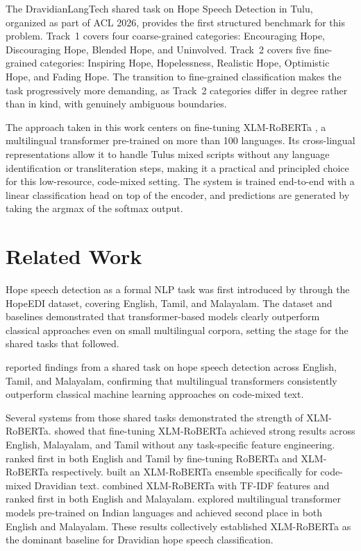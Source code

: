 \documentclass[11pt]{article}
\begin{document}
The DravidianLangTech shared task on Hope Speech Detection in Tulu,
organized as part of ACL 2026, provides the first structured benchmark for this
problem. Track~1 covers four coarse-grained categories: Encouraging Hope,
Discouraging Hope, Blended Hope, and Uninvolved. Track~2 covers five fine-grained
categories: Inspiring Hope, Hopelessness, Realistic Hope, Optimistic Hope, and
Fading Hope. The transition to fine-grained classification makes the task
progressively more demanding, as Track~2 categories differ in degree rather than
in kind, with genuinely ambiguous boundaries.

The approach taken in this work centers on fine-tuning XLM-RoBERTa \citep{conneau2020},
a multilingual transformer pre-trained on more than 100 languages. Its cross-lingual
representations allow it to handle Tulu\textquotesingle{}s mixed scripts without any
language identification or transliteration steps, making it a practical and principled
choice for this low-resource, code-mixed setting. The system is trained end-to-end
with a linear classification head on top of the encoder, and predictions are generated
by taking the argmax of the softmax output.

\section{Related Work}

Hope speech detection as a formal NLP task was first introduced by
 through the HopeEDI dataset, covering English, Tamil, and
Malayalam. The dataset and baselines demonstrated that transformer-based models
clearly outperform classical approaches even on small multilingual corpora, setting
the stage for the shared tasks that followed.

 reported findings from a shared task on hope speech
detection across English, Tamil, and Malayalam, confirming that multilingual
transformers consistently outperform classical machine learning approaches on
code-mixed text.

Several systems from those shared tasks demonstrated the strength of XLM-RoBERTa.
 showed that fine-tuning XLM-RoBERTa achieved strong results
across English, Malayalam, and Tamil without any task-specific feature engineering.
 ranked first in both English and Tamil by fine-tuning RoBERTa
and XLM-RoBERTa respectively.  built an XLM-RoBERTa
ensemble specifically for code-mixed Dravidian text.  combined
XLM-RoBERTa with TF-IDF features and ranked first in both English and Malayalam.
 explored multilingual transformer models pre-trained on Indian
languages and achieved second place in both English and Malayalam. These results
collectively established XLM-RoBERTa as the dominant baseline for Dravidian hope
speech classification.
\end{document}
